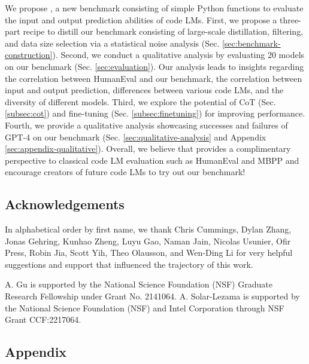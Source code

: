 We propose \benchmark, a new benchmark consisting of simple Python functions to evaluate the input and output prediction abilities of code LMs. First, we propose a three-part recipe to distill our benchmark consisting of large-scale distillation, filtering, and data size selection via a statistical noise analysis (Sec. \ref{sec:benchmark-construction}). Second, we conduct a qualitative analysis by evaluating 20 models on our benchmark (Sec. \ref{sec:evaluation}). Our analysis leads to insights regarding the correlation between HumanEval and our benchmark, the correlation between input and output prediction, differences between various code LMs, and the diversity of different models. Third, we explore the potential of CoT (Sec. \ref{subsec:cot}) and fine-tuning (Sec. \ref{subsec:finetuning}) for improving performance. Fourth, we provide a qualitative analysis showcasing successes and failures of GPT-4 on our benchmark (Sec. \ref{sec:qualitative-analysis} and Appendix \ref{sec:appendix-qualitative}). Overall, we believe that \benchmark provides a complimentary perspective to classical code LM evaluation such as HumanEval and MBPP and encourage creators of future code LMs to try out our benchmark!

\subsection{Acknowledgements}
In alphabetical order by first name, we thank Chris Cummings, Dylan Zhang, Jonas Gehring, Kunhao Zheng, Luyu Gao, Naman Jain, Nicolas Usunier, Ofir Press, Robin Jia, Scott Yih, Theo Olausson, and Wen-Ding Li for very helpful suggestions and support that influenced the trajectory of this work.

A. Gu is supported by the National Science Foundation (NSF) Graduate Research Fellowship under Grant No. 2141064. A. Solar-Lezama is supported by the National Science Foundation (NSF) and Intel Corporation through NSF Grant CCF:2217064.

\subsection{Appendix}





